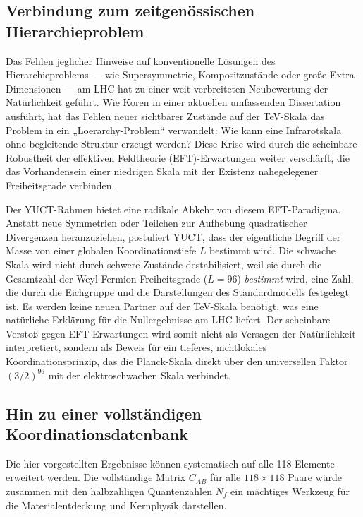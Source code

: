 \documentclass[11pt,a4paper]{article}
\begin{document}
	\subsection{Verbindung zum zeitgenössischen Hierarchieproblem}
	
	Das Fehlen jeglicher Hinweise auf konventionelle Lösungen des Hierarchieproblems — wie Supersymmetrie, Kompositzustände oder große Extra-Dimensionen — am LHC hat zu einer weit verbreiteten Neubewertung der Natürlichkeit geführt. Wie Koren in einer aktuellen umfassenden Dissertation \cite{Koren2020} ausführt, hat das Fehlen neuer sichtbarer Zustände auf der TeV-Skala das Problem in ein „Loerarchy-Problem“ verwandelt: Wie kann eine Infrarotskala ohne begleitende Struktur erzeugt werden? Diese Krise wird durch die scheinbare Robustheit der effektiven Feldtheorie (EFT)-Erwartungen weiter verschärft, die das Vorhandensein einer niedrigen Skala mit der Existenz nahegelegener Freiheitsgrade verbinden.
	
	Der YUCT-Rahmen bietet eine radikale Abkehr von diesem EFT-Paradigma. Anstatt neue Symmetrien oder Teilchen zur Aufhebung quadratischer Divergenzen heranzuziehen, postuliert YUCT, dass der eigentliche Begriff der Masse von einer globalen Koordinationstiefe \(L\) bestimmt wird. Die schwache Skala wird nicht durch schwere Zustände destabilisiert, weil sie durch die Gesamtzahl der Weyl-Fermion-Freiheitsgrade (\(L=96\)) \emph{bestimmt} wird, eine Zahl, die durch die Eichgruppe und die Darstellungen des Standardmodells festgelegt ist. Es werden keine neuen Partner auf der TeV-Skala benötigt, was eine natürliche Erklärung für die Nullergebnisse am LHC liefert. Der scheinbare Verstoß gegen EFT-Erwartungen wird somit nicht als Versagen der Natürlichkeit interpretiert, sondern als Beweis für ein tieferes, nichtlokales Koordinationsprinzip, das die Planck-Skala direkt über den universellen Faktor \((3/2)^{96}\) mit der elektroschwachen Skala verbindet.
	
	\subsection{Hin zu einer vollständigen Koordinationsdatenbank}
	
	Die hier vorgestellten Ergebnisse können systematisch auf alle 118 Elemente erweitert werden. Die vollständige Matrix \(C_{AB}\) für alle \(118\times 118\) Paare würde zusammen mit den halbzahligen Quantenzahlen \(N_f\) ein mächtiges Werkzeug für die Materialentdeckung und Kernphysik darstellen.
	
\end{document}
